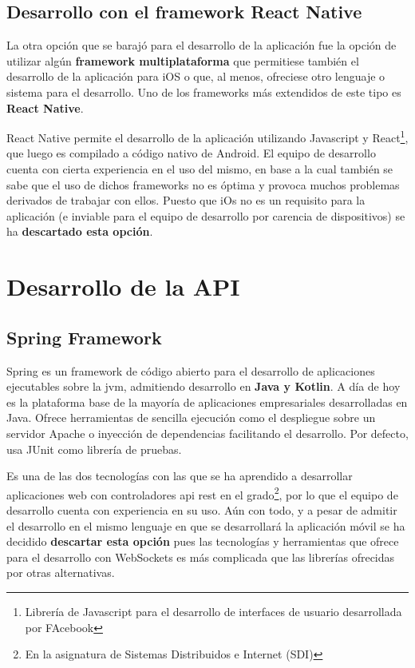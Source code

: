 \subsection{Desarrollo con el framework React Native}

La otra opción que se barajó para el desarrollo de la aplicación fue la opción de utilizar algún \textbf{framework multiplataforma} que permitiese también el desarrollo de la aplicación para iOS o que, al menos, ofreciese otro lenguaje o sistema para el desarrollo. Uno de los frameworks más extendidos de este tipo es \textbf{React Native}.

React Native permite el desarrollo de la aplicación utilizando Javascript y React\footnote{Librería de Javascript para el desarrollo de interfaces de usuario desarrollada por FAcebook}, que luego es compilado a código nativo de Android. El equipo de desarrollo cuenta con cierta experiencia en el uso del mismo, en base a la cual también se sabe que el uso de dichos frameworks no es óptima y provoca muchos problemas derivados de trabajar con ellos. Puesto que iOs no es un requisito para la aplicación (e inviable para el equipo de desarrollo por carencia de dispositivos) se ha \textbf{descartado esta opción}.

\section{Desarrollo de la API}

\subsection{Spring Framework}

Spring es un framework de código abierto para el desarrollo de aplicaciones ejecutables sobre la \acrshort{jvm}, admitiendo desarrollo en \textbf{Java y Kotlin}. A día de hoy es la plataforma base de la mayoría de aplicaciones empresariales desarrolladas en Java. Ofrece herramientas de sencilla ejecución como el despliegue sobre un servidor Apache o inyección de dependencias facilitando el desarrollo. Por defecto, usa JUnit como librería de pruebas.

Es una de las dos tecnologías con las que se ha aprendido a desarrollar aplicaciones web con controladores \acrshort{api} \acrshort{rest} en el grado\footnote{En la asignatura de Sistemas Distribuidos e Internet (SDI)}, por lo que el equipo de desarrollo cuenta con experiencia en su uso. Aún con todo, y a pesar de admitir el desarrollo en el mismo lenguaje en que se desarrollará la aplicación móvil se ha decidido \textbf{descartar esta opción} pues las tecnologías y herramientas que ofrece para el desarrollo con WebSockets es más complicada que las librerías ofrecidas por otras alternativas.

